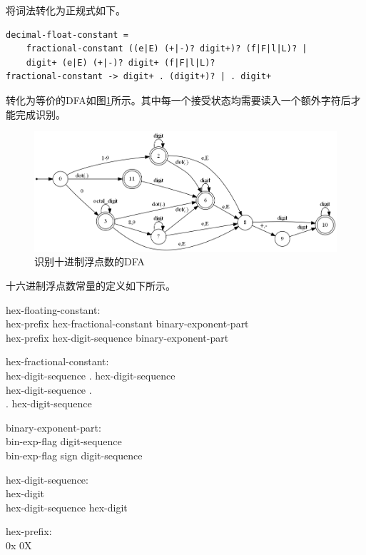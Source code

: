 \documentclass[UTF8, twoside, titlepage]{ctexart}
\newenvironment{lex}
{
	\linespread{1.2}
	\leftskip=2.5cm
	\rightskip=2.5cm
	\itshape
	\setlength{\parindent}{-1cm}
}
{\par}
\begin{document}
将词法转化为正规式如下。

\begin{lstlisting}
decimal-float-constant =
	fractional-constant ((e|E) (+|-)? digit+)? (f|F|l|L)? | 
	digit+ (e|E) (+|-)? digit+ (f|F|l|L)?
fractional-constant -> digit+ . (digit+)? | . digit+
\end{lstlisting}

转化为等价的DFA如图\ref{fig:decimal_float}所示。其中每一个接受状态均需要读入一个额外字符后才能完成识别。

\begin{figure}[htbp]
	\centering
	\includegraphics[width=\textwidth]{images/decimal_float.png}
	\caption{识别十进制浮点数的DFA}
	\label{fig:decimal_float}
\end{figure}

十六进制浮点数常量的定义如下所示。

\begin{lex}
hex-floating-constant:\\
	hex-prefix hex-fractional-constant binary-exponent-part \\
	hex-prefix hex-digit-sequence binary-exponent-part 
	
hex-fractional-constant:\\
	hex-digit-sequence . hex-digit-sequence \\
	hex-digit-sequence . \\
	. hex-digit-sequence
	
binary-exponent-part:\\
	bin-exp-flag digit-sequence \\
	bin-exp-flag sign digit-sequence
	
hex-digit-sequence:\\
	hex-digit \\
	hex-digit-sequence hex-digit
	
hex-prefix: \\
{
	\normalfont
	\ttfamily
	0x 0X
}
\end{lex}
\end{document}
